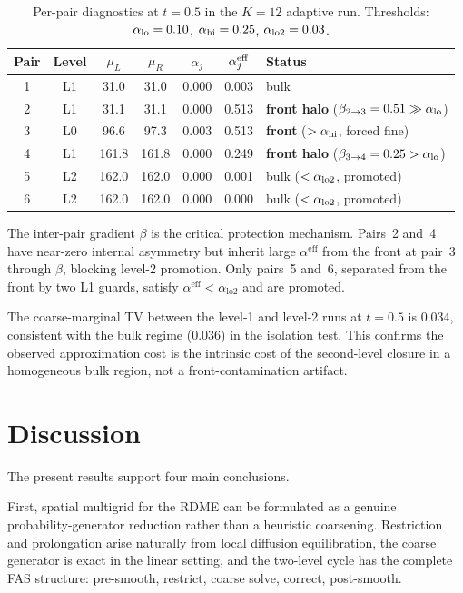 \documentclass[11pt]{article}
\begin{document}
\begin{table}[ht]
\centering
\caption{Per-pair diagnostics at $t=0.5$ in the $K=12$ adaptive run.
Thresholds: $\alpha_{\rm lo}=0.10$, $\alpha_{\rm hi}=0.25$,
$\alpha_{\rm lo2}=0.03$.}
\label{tab:policy}
\begin{tabular}{ccccccl}
\toprule
Pair & Level & $\mu_L$ & $\mu_R$ & $\alpha_j$ & $\alpha_j^{\rm eff}$ & Status \\
\midrule
1 & L1 & 31.0 & 31.0 & 0.000 & 0.003 & bulk \\
2 & L1 & 31.1 & 31.1 & 0.000 & 0.513 & \textbf{front halo}
    ($\beta_{2\to3}=0.51 \gg \alpha_{\rm lo}$) \\
3 & L0 & 96.6 & 97.3 & 0.003 & 0.513 & \textbf{front}
    ($>\alpha_{\rm hi}$, forced fine) \\
4 & L1 & 161.8 & 161.8 & 0.000 & 0.249 & \textbf{front halo}
    ($\beta_{3\to4}=0.25>\alpha_{\rm lo}$) \\
5 & L2 & 162.0 & 162.0 & 0.000 & 0.001 & bulk ($<\alpha_{\rm lo2}$, promoted) \\
6 & L2 & 162.0 & 162.0 & 0.000 & 0.000 & bulk ($<\alpha_{\rm lo2}$, promoted) \\
\bottomrule
\end{tabular}
\end{table}

The inter-pair gradient $\beta$ is the critical protection mechanism.
Pairs~2 and~4 have near-zero internal asymmetry but inherit large
$\alpha^{\mathrm{eff}}$ from the front at pair~3 through $\beta$, blocking
level-2 promotion.  Only pairs~5 and~6, separated from the front by two L1
guards, satisfy $\alpha^{\mathrm{eff}} < \alpha_{\mathrm{lo2}}$ and are
promoted.

The coarse-marginal TV between the level-1 and level-2 runs at $t=0.5$ is
$0.034$, consistent with the bulk regime ($0.036$) in the isolation test.
This confirms the observed approximation cost is the intrinsic cost of the
second-level closure in a homogeneous bulk region, not a front-contamination
artifact.

\section{Discussion}

The present results support four main conclusions.

First, spatial multigrid for the RDME can be formulated as a genuine
probability-generator reduction rather than a heuristic coarsening.
Restriction and prolongation arise naturally from local diffusion
equilibration, the coarse generator is exact in the linear setting, and the
two-level cycle has the complete FAS structure: pre-smooth, restrict, coarse
solve, correct, post-smooth.
\end{document}
